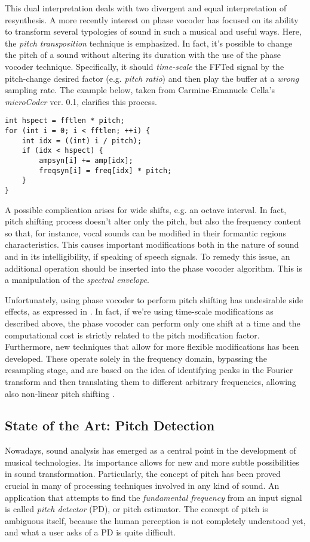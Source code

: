 This dual interpretation deals with two divergent and equal interpretation of resynthesis. A more recently interest on phase vocoder has focused on its ability to transform several typologies of sound in such a musical and useful ways. Here, the \emph{pitch transposition} technique is emphasized. 
In fact, it's possible to change the pitch of a sound without altering its duration with the use of the phase vocoder technique. Specifically, it should \emph{time-scale} the FFTed signal by the pitch-change desired factor (e.g. \emph{pitch ratio}) and then play the buffer at a \emph{wrong} sampling rate. The example below, taken from Carmine-Emanuele Cella's \emph{microCoder} ver. 0.1, clarifies this process.
\newline
\begin{lstlisting}                     
int hspect = fftlen * pitch;
for (int i = 0; i < fftlen; ++i) {
	int idx = ((int) i / pitch);
	if (idx < hspect) {
	    ampsyn[i] += amp[idx];
	    freqsyn[i] = freq[idx] * pitch;
	}
}
\end{lstlisting}
A possible complication arises for wide shifts, e.g. an octave interval. In fact, pitch shifting process doesn't alter only the pitch, but also the frequency content so that, for instance, vocal sounds can be modified in their formantic regions characteristics. This causes important modifications both in the nature of sound and in its intelligibility, if speaking of speech signals. To remedy this issue, an additional operation should be inserted into the phase vocoder algorithm. This is a manipulation of the \emph{spectral envelope}. 

Unfortunately, using phase vocoder to perform pitch shifting has undesirable side effects, as expressed in \cite{laroche2003phase}. In fact, if we're using time-scale modifications as described above, the phase vocoder can perform only one shift at a time and the computational cost is strictly related to the pitch modification factor. Furthermore, new techniques that allow for more flexible modifications has been developed. These operate solely in the frequency domain, bypassing the resampling stage, and are based on the idea of identifying peaks in the Fourier transform and then translating them to different arbitrary frequencies, allowing also non-linear pitch shifting \cite{laroche1999new}.

\subsection{State of the Art: Pitch Detection}
\label{art2}
Nowadays, sound analysis has emerged as a central point in the development of musical technologies. Its importance allows for new and more subtle possibilities in sound transformation. Particularly, the concept of pitch has been proved crucial in many of processing techniques involved in any kind of sound. An application that attempts to find the \emph{fundamental frequency} from an input signal is called \emph{pitch detector} (PD), or pitch estimator. The concept of pitch is ambiguous itself, because the human perception is not completely understood yet, and what a user asks of a PD is quite difficult. 

